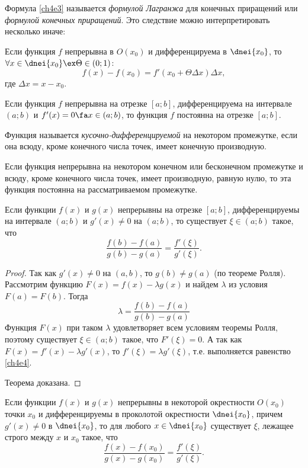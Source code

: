 Формула \eqref{ch4e3} называется \textit{формулой Лагранжа} для конечных приращений или \textit{формулой конечных приращений}.
Это следствие можно интерпретировать несколько иначе:

\begin{cons}
Если функция $f$ непрерывна в $O(x_0)$ и дифференцируема в $\dnei{x_0}$, то $\forall x \in \dnei{x_0} \ex \Theta \in (0;1)$:
$$
f(x) - f(x_0) = f'(x_0 + \Theta\Delta x)\Delta x,
$$
где $\Delta x=x-x_0$.
\end{cons}

\begin{cons}
Если функция $f$ непрерывна на отрезке $[a; b]$, дифференцируема на интервале $(a;b)$ и $f'(x) = 0 \fa x \in (a;b)$, то функция $f$ постоянна на отрезке $[a; b]$.	
\end{cons}

\begin{defn}Функция называется \textit{кусочно-дифференцируемой} на некотором промежутке, если она всюду, кроме конечного числа точек, имеет конечную производную.
\end{defn}

\begin{cons} Если функция непрерывна на некотором конечном или бесконечном промежутке и всюду, кроме конечного числа точек, имеет производную, равную нулю, то эта функция постоянна на рассматриваемом промежутке.
\end{cons}

\begin{thm} [Коши] Если функции $f(x)$ и $g(x)$ непрерывны на отрезке $[a; b]$, дифференцируемы на интервале $(a; b)$ и $g'(x) \ne 0$ на $(a; b)$, то существует $\xi \in (a; b)$ такое, что
\begin{equation}
\label{ch4e4}
\frac{f(b)-f(a)}{g(b)-g(a)}=\frac{f'(\xi)}{g'(\xi)}.
\end{equation}
\end{thm}

\begin{proof} Так как $g'(x) \ne 0$ на $(a,b)$, то $g(b)\ne g(a)$ (по теореме Ролля). Рассмотрим функцию $F(x) =f(x) - \lambda g(x)$ и найдем $\lambda$ из условия $F(a) = F(b)$. Тогда
$$
\lambda = \frac{f(b)-f(a)}{g(b)-g(a)}
$$
Функция $F(x)$ при таком $\lambda$ удовлетворяет всем условиям теоремы Ролля, поэтому существует $\xi \in (a; b)$ такое, что $F'(\xi) = 0$. А так как $F(x) = f'(x) - \lambda g'(x)$, то $f'(\xi) = \lambda g'(\xi)$, т.е. выполняется равенство \eqref{ch4e4}.

\noindent Теорема доказана.
\end{proof}

\begin{cons} Если функции $f(x)$ и $g(x)$ непрерывны в некоторой окрестности $O(x_0)$ точки $x_0$ и дифференцируемы в проколотой
окрестности $\dnei{x_0}$, причем $g'(x) \ne 0$ в  $\dnei{x_0}$, то  для любого $x \in  \dnei{x_0}$ существует $\xi$, лежащее строго между $x$ и $x_0$ такое, что
$$
\frac{f(x)-f(x_0)}{g(x)-g(x_0)}=\frac{f'(\xi)}{g'(\xi)}.
$$
\end{cons}